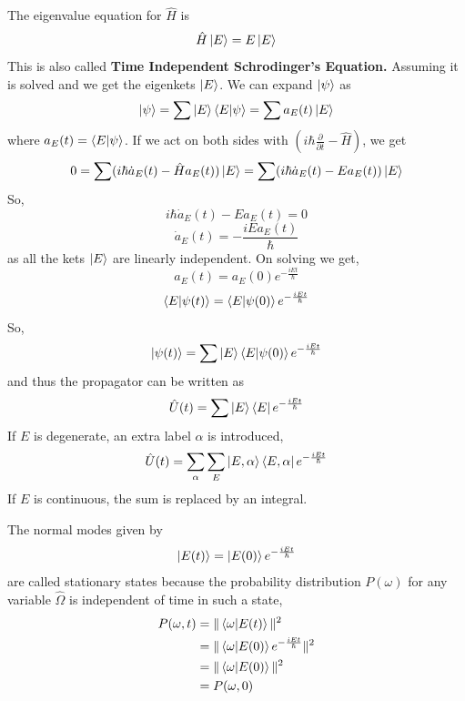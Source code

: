 \documentclass[12pt,a4paper]{report}
\newcommand{\parder}[2]{\frac{\partial#1}{\partial#2}}
\begin{document}
The eigenvalue equation for $\hat{H}$ is
\begin{equation*}
    \hat{H}\ket{E} = E\ket{E}
\end{equation*}
This is also called \textbf{Time Independent Schrodinger's Equation.} Assuming it is solved and we get the
eigenkets $\ket{E}$. We can expand $\ket{\psi}$ as
\begin{equation*}
    \ket{\psi} = \sum \ket{E}\bra{E}\ket{\psi} = \sum a_E(t) \ket{E}
\end{equation*}
where $a_E(t) = \bra{E}\ket{\psi}$. If we act on both sides with $\left( i\hbar\parder{}{t} - \hat{H} \right)$, we get
\begin{equation*}
    0 = \sum (i\hbar\dot{a}_E(t) - \hat{H}a_E(t)) \ket{E} = \sum (i\hbar\dot{a}_E(t) - Ea_E(t)) \ket{E}
\end{equation*}
So,
\begin{equation*}
    i\hbar\dot{a}_E(t) - Ea_E(t) = 0
\end{equation*}
\begin{equation*}
    \dot{a}_E(t) = -\frac{iEa_E(t)}{\hbar}
\end{equation*}
as all the kets $\ket{E}$ are linearly independent. On solving we get,
\begin{equation*}
    a_E(t) = a_E(0)e^{-\frac{iEt}{\hbar}}
\end{equation*}
\begin{equation*}
    \bra{E}\ket{\psi(t)} = \bra{E}\ket{\psi(0)}e^{-\frac{iEt}{\hbar}}
\end{equation*}
So,
\begin{equation*}
    \ket{\psi(t)} = \sum \ket{E}\bra{E}\ket{\psi(0)}e^{-\frac{iEt}{\hbar}}
\end{equation*}
and thus the propagator can be written as
\begin{equation*}
    \hat{U}(t) = \sum \ket{E}\bra{E}e^{-\frac{iEt}{\hbar}}
\end{equation*}
If $E$ is degenerate, an extra label $\alpha$ is introduced,
\begin{equation*}
    \hat{U}(t) = \sum_\alpha\sum_E \ket{E, \alpha}\bra{E, \alpha}e^{-\frac{iEt}{\hbar}}
\end{equation*}
If $E$ is continuous, the sum is replaced by an integral.

The normal modes given by
\begin{equation*}
    \ket{E(t)} = \ket{E(0)}e^{-\frac{iEt}{\hbar}}
\end{equation*}
are called stationary states because the probability distribution $P(\omega)$ for any variable $\hat{\Omega}$
is independent of time in such a state,
\begin{align*}
    P(\omega, t) &= \| \bra{\omega}\ket{E(t)} \|^2 \\
    &= \| \bra{\omega}\ket{E(0)} e^{-\frac{iEt}{\hbar}} \|^2 \\
    &= \| \bra{\omega}\ket{E(0)} \|^2 \\
    &= P(\omega, 0)
\end{align*}
\end{document}
